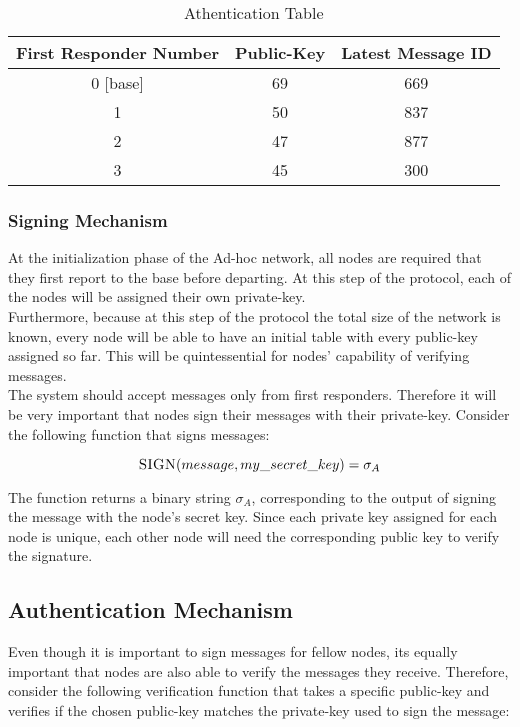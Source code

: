 \documentclass[letterpaper]{article}
\begin{document}
\begin{table}[ht]
\caption{Athentication Table} %
\centering %
\begin{tabular}{c c c } %
\hline
\hline %
First Responder Number & Public-Key & Latest Message ID  \\[0.5ex] %
\hline %
0 [base] & 69 & 669\\
1 & 50 & 837\\
2 & 47 & 877 \\
3 & 45 & 300\\ [1ex]
\hline
\end{tabular}
\label{table:nonlin}
\end{table}

\subsubsection{Signing Mechanism}
At the initialization phase of the Ad-hoc network, all nodes are required that they first report to the base before departing. 
At this step of the protocol, each of the nodes will be assigned their own private-key. \\
Furthermore, because at this step of the protocol the total size of the network is known, every node will be able to have an initial table with every public-key assigned so far. 
This will be quintessential for nodes' capability of verifying messages.
\\
The system should accept messages only from first responders. Therefore it will be very important that nodes sign their messages with their private-key. Consider the following function that signs messages:

$$\textsc{SIGN}(message, my\_secret\_key) = \sigma_{A}$$

The function returns a binary string $\sigma_{A}$, corresponding to the output of signing the message with the node's secret key. Since each private key assigned for each node is unique, each other node will need the corresponding public key to verify the signature.

\subsection{Authentication Mechanism}
Even though it is important to sign messages for fellow nodes, its equally important that nodes are also able to verify the messages they receive. 
Therefore, consider the following verification function that takes a specific public-key and verifies if the chosen public-key matches the private-key used to sign the message:
\end{document}
